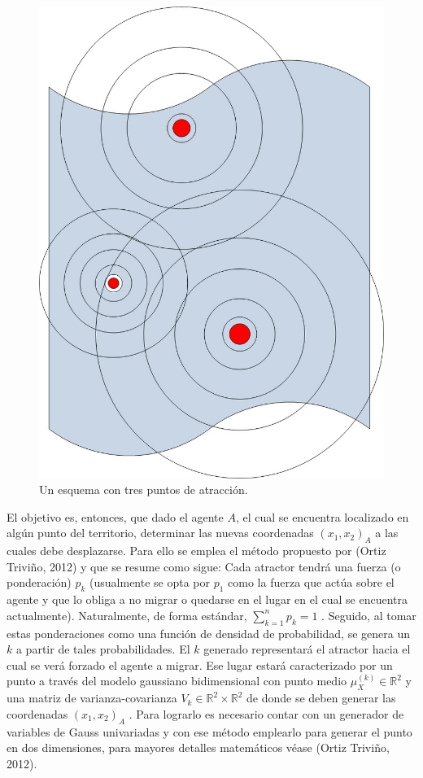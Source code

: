 \begin{figure}[H]
\centering
\captionsetup{justification=centering,margin=2cm}
\includegraphics[scale=0.3]{chapters/chapter8/figures/1-2-1.jpg}
\caption{Un esquema con tres puntos de atracción.}
\label{fig:1-2}
\end{figure}
El objetivo es, entonces, que dado el agente  $A$, el cual se encuentra localizado en algún punto del territorio, determinar las nuevas coordenadas $(x_1,x_2)_A$  a las cuales debe desplazarse.  Para ello se emplea el método propuesto por (Ortiz Triviño, 2012) y que se resume como sigue: Cada atractor tendrá una fuerza (o ponderación) $p_k$  (usualmente se opta por $p_1$  como la fuerza que actúa sobre el agente y que lo obliga a no migrar o quedarse en el lugar en el cual se encuentra actualmente).  Naturalmente, de forma estándar,  $\sum_{k=1}^{n}p_k=1$ . Seguido, al tomar estas ponderaciones como una función de densidad de probabilidad, se genera un $k$  a partir de tales probabilidades. El  $k$ generado representará el atractor hacia el cual se verá forzado el agente a migrar. Ese lugar estará caracterizado por un punto a través del modelo gaussiano bidimensional con punto medio $\mu_X^{\left(k\right)}\in\mathbb{R}^2$  y una matriz de varianza-covarianza $V_k\in\mathbb{R}^2\times\mathbb{R}^2$  de donde se deben generar las coordenadas $\left(x_1,x_2\right)_A$ .  Para lograrlo es necesario contar con un generador de variables de Gauss univariadas y con ese método emplearlo para generar el punto en dos dimensiones, para mayores detalles matemáticos véase (Ortiz Triviño, 2012).
